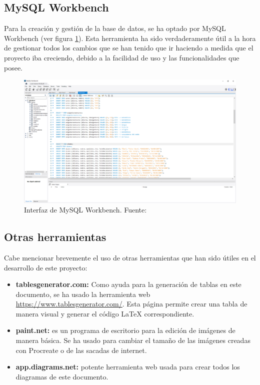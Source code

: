 \subsection{MySQL Workbench}
\label{sub:mysql}
Para la creación y gestión de la base de datos, se ha optado por MySQL Workbench (ver figura \ref{Fig:mysql}). Esta herramienta ha sido verdaderamente útil a la hora de gestionar todos los cambios que se han tenido que ir haciendo a medida que el proyecto iba creciendo, debido a la facilidad de uso y las funcionalidades que posee.

\begin{figure}[h]
\centering\includegraphics[width=1\linewidth]{figs/mysql.png}
\caption{Interfaz de MySQL Workbench. Fuente: \cite{mysql}}
\label{Fig:mysql}
\end{figure}


\subsection{Otras herramientas}
Cabe mencionar brevemente el uso de otras herramientas que han sido útiles en el desarrollo de este proyecto:
\begin{itemize}
	\item \textbf{tablesgenerator.com:} Como ayuda para la generación de tablas en este documento, se ha usado la herramienta web \url{https://www.tablesgenerator.com/}. Esta página permite crear una tabla de manera visual y generar el código \LaTeX{} correspondiente.
	\item \textbf{paint.net:} es un programa de escritorio para la edición de imágenes de manera básica. Se ha usado para cambiar el tamaño de las imágenes creadas con Procreate o de las sacadas de internet.
	\item \textbf{app.diagrams.net:} potente herramienta web usada para crear todos los diagramas de este documento.
\end{itemize}


